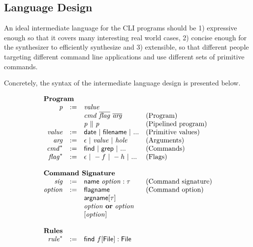 \subsection{Language Design}
\label{subsec:represent}
An ideal intermediate language for the CLI programs should be 1) expressive enough so that it covers many interesting real world cases, 2) concise enough for the synthesizer to efficiently synthesize and 3) extensible, so that different people targeting different command line applications and use different sets of primitive commands.

Concretely, the syntax of the intermediate language design is presented below.

\begin{figure}
\[
\begin{array}{rlll}
\multicolumn{3}{l}{\textbf{Program}}\\
\mathit{p} & := & \mathit{value} \\
    &  & \mathit{cmd}~\overline{\mathit{flag}}~\overline{\mathit{arg}} & \textrm{(Program)}\\
    &  & \mathit{p} ~\| ~\mathit{p} & \textrm{(Pipelined program)}\\
\mathit{value} & := & \mathsf{date} ~|~ \mathsf{filename} ~|~ ... & \textrm{(Primitive values)}\\
\mathit{arg} & := & \epsilon ~|~ \mathit{value} ~|~ \mathit{hole} & \textrm{(Arguments)}\\
\mathit{cmd}^{*} & := & \mathsf{find} ~|~ \mathsf{grep} ~|~ ... & \textrm{(Commands)}\\
\mathit{flag}^{*} & := & \epsilon ~|~ -f ~|~ -h ~|~ ... & \textrm{(Flags)}\\
~\\
\multicolumn{3}{l}{\textbf{Command Signature}}\\
\mathit{sig} & := & \mathsf{name}~\mathit{option}:\tau & \textrm{(Command signature)}\\
\mathit{option} &:= & \mathsf{flagname} & \textrm{(Command option)}\\
                &   & \mathsf{argname}[\tau]\\
                &   & \mathit{option}~\mathbf{or}~\mathit{option}\\
                &   & [ \mathit{option} ]\\
~\\
\multicolumn{3}{l}{\textbf{Rules}}\\
\mathit{rule}^{*} &:=& \mathsf{find}~f[\mathsf{File}] : \mathsf{File}\\

\end{array}\]
\end{figure}
